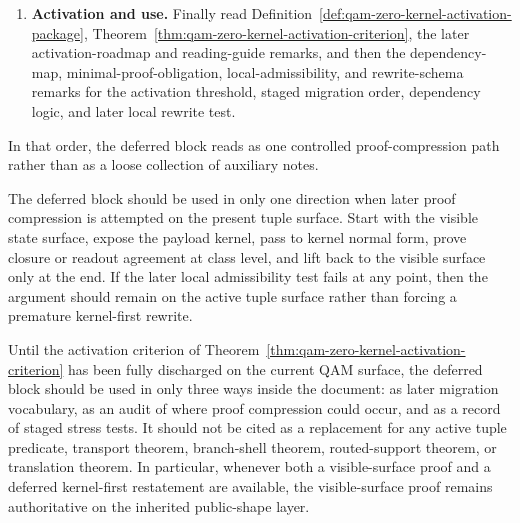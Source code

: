 \begin{remark}
\begin{enumerate}[leftmargin=2em]
 \item \textbf{Activation and use.} Finally read Definition~\ref{def:qam-zero-kernel-activation-package}, Theorem~\ref{thm:qam-zero-kernel-activation-criterion}, the later activation-roadmap and reading-guide remarks, and then the dependency-map, minimal-proof-obligation, local-admissibility, and rewrite-schema remarks for the activation threshold, staged migration order, dependency logic, and later local rewrite test.
\end{enumerate}
In that order, the deferred block reads as one controlled proof-compression path rather than as a loose collection of auxiliary notes.
\end{remark}

\begin{remark}\label{rem:qam-zero-kernel-execution-rule}
The deferred block should be used in only one direction when later proof compression is attempted on the present tuple surface. Start with the visible state surface, expose the payload kernel, pass to kernel normal form, prove closure or readout agreement at class level, and lift back to the visible surface only at the end. If the later local admissibility test fails at any point, then the argument should remain on the active tuple surface rather than forcing a premature kernel-first rewrite.
\end{remark}

\begin{remark}\label{rem:qam-zero-kernel-present-use}
Until the activation criterion of Theorem~\ref{thm:qam-zero-kernel-activation-criterion} has been fully discharged on the current QAM surface, the deferred block should be used in only three ways inside the document: as later migration vocabulary, as an audit of where proof compression could occur, and as a record of staged stress tests. It should not be cited as a replacement for any active tuple predicate, transport theorem, branch-shell theorem, routed-support theorem, or translation theorem. In particular, whenever both a visible-surface proof and a deferred kernel-first restatement are available, the visible-surface proof remains authoritative on the inherited public-shape  layer.
\end{remark}



